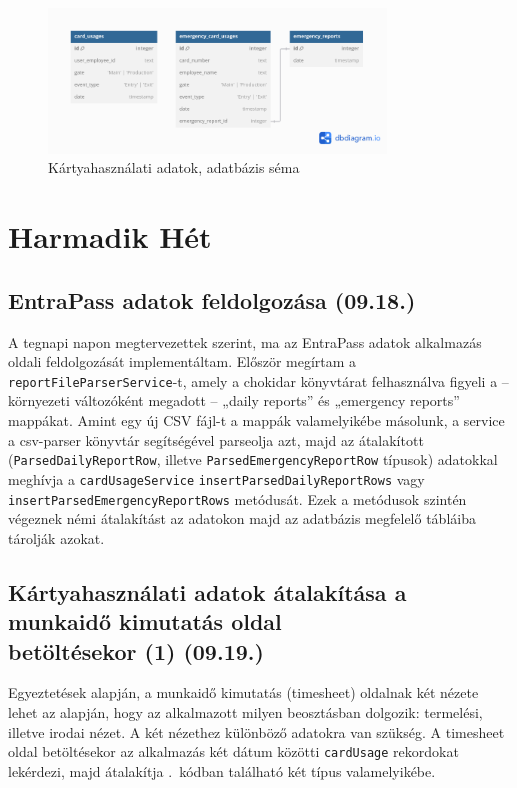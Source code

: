 \documentclass[a4paper]{article}
\newcommand{\inlts}[1]{\texttt{#1}}
\begin{document}
\begin{figure}[ht]
  \centering
  \includegraphics[clip, trim=0 50 0 0, width = 0.8\textwidth]{images/card_usages_schema.png}
  \caption{Kártyahasználati adatok, adatbázis séma}
  \label{fig:card_usages_schema}
\end{figure}


\section{Harmadik Hét}

\subsection{EntraPass adatok feldolgozása (09.18.)}

A tegnapi napon megtervezettek szerint, ma az EntraPass adatok alkalmazás oldali feldolgozását
implementáltam. Először megírtam a \inlts{reportFileParserService}-t, amely a chokidar könyvtárat
felhasználva figyeli a – környezeti változóként megadott – „daily reports” és „emergency reports”
mappákat. Amint egy új CSV fájl-t a mappák valamelyikébe másolunk, a service a csv-parser
könyvtár segítségével parseolja azt, majd az átalakított (\inlts{ParsedDailyReportRow}, illetve
\inlts{ParsedEmergencyReportRow} típusok) adatokkal meghívja a \inlts{cardUsageService}
\inlts{insertParsedDailyReportRows} vagy \inlts{insertParsedEmergencyReportRows} metódusát. Ezek
a metódusok szintén végeznek némi átalakítást az adatokon majd az adatbázis megfelelő tábláiba
tárolják azokat.

\subsection{Kártyahasználati adatok átalakítása a munkaidő kimutatás oldal\\ betöltésekor (1) (09.19.)}

Egyeztetések alapján, a munkaidő kimutatás (timesheet) oldalnak két nézete lehet az alapján, hogy az
alkalmazott milyen beosztásban dolgozik: termelési, illetve irodai nézet. A két nézethez különböző
adatokra van szükség. A timesheet oldal betöltésekor az alkalmazás két dátum közötti \inlts{cardUsage}
rekordokat lekérdezi, majd átalakítja .~kódban található két típus valamelyikébe.
\end{document}
